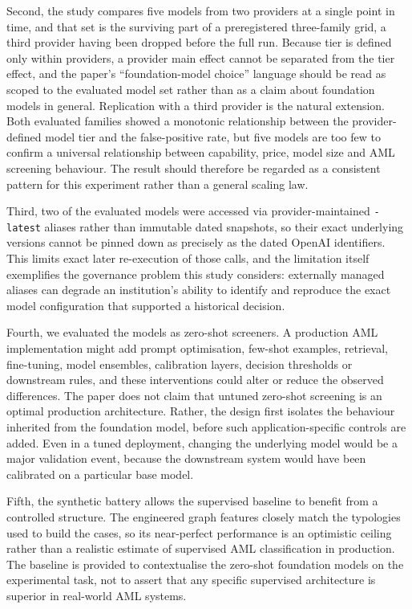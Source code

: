 \documentclass[pdflatex,sn-basic,Numbered]{sn-jnl}
\begin{document}
Second, the study compares five models from two providers at a single point in time, and that set is the surviving part of a preregistered three-family grid, a third provider having been dropped before the full run. Because tier is defined only within providers, a provider main effect cannot be separated from the tier effect, and the paper's ``foundation-model choice'' language should be read as scoped to the evaluated model set rather than as a claim about foundation models in general. Replication with a third provider is the natural extension. Both evaluated families showed a monotonic relationship between the provider-defined model tier and the false-positive rate, but five models are too few to confirm a universal relationship between capability, price, model size and AML screening behaviour. The result should therefore be regarded as a consistent pattern for this experiment rather than a general scaling law.

Third, two of the evaluated models were accessed via provider-maintained \texttt{-latest} aliases rather than immutable dated snapshots, so their exact underlying versions cannot be pinned down as precisely as the dated OpenAI identifiers. This limits exact later re-execution of those calls, and the limitation itself exemplifies the governance problem this study considers: externally managed aliases can degrade an institution's ability to identify and reproduce the exact model configuration that supported a historical decision.

Fourth, we evaluated the models as zero-shot screeners. A production AML implementation might add prompt optimisation, few-shot examples, retrieval, fine-tuning, model ensembles, calibration layers, decision thresholds or downstream rules, and these interventions could alter or reduce the observed differences. The paper does not claim that untuned zero-shot screening is an optimal production architecture. Rather, the design first isolates the behaviour inherited from the foundation model, before such application-specific controls are added. Even in a tuned deployment, changing the underlying model would be a major validation event, because the downstream system would have been calibrated on a particular base model.

Fifth, the synthetic battery allows the supervised baseline to benefit from a controlled structure. The engineered graph features closely match the typologies used to build the cases, so its near-perfect performance is an optimistic ceiling rather than a realistic estimate of supervised AML classification in production. The baseline is provided to contextualise the zero-shot foundation models on the experimental task, not to assert that any specific supervised architecture is superior in real-world AML systems.
\end{document}
